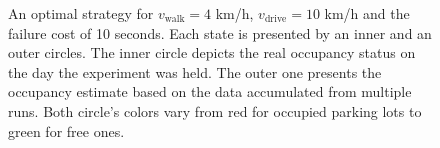 \begin{figure}[t]
\begin{center}
\hspace{2mm}
\hspace{2mm}
\end{center}
\caption{An optimal strategy for $v_{\mathrm{walk}} = 4$ km/h, $v_{\mathrm{drive}} = 10$ km/h and the failure cost of 10 seconds. Each state is presented by an inner and an outer circles. The inner circle depicts the real occupancy status on the day the experiment was held. The outer one presents the occupancy estimate based on the data accumulated from multiple runs. Both circle's colors vary from red for occupied parking lots to green for free ones.}
\label{fig:w_4_d_10_w_10_log_12_12}
\end{figure}

